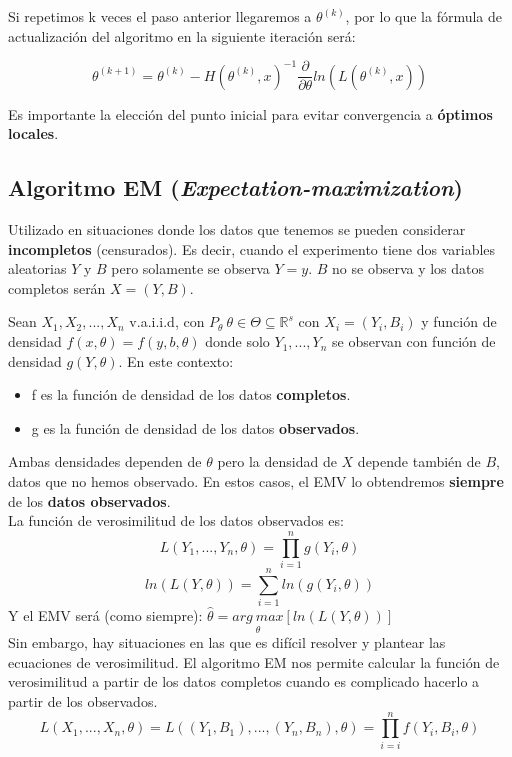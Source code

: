 Si repetimos k veces el paso anterior llegaremos a $\theta^{(k)}$, por lo que la fórmula de actualización del algoritmo en la siguiente iteración será:

$$\theta^{(k+1)}=\theta^{(k)}-H(\theta^{(k)},x)^{-1}\frac{\partial}{\partial\theta}ln(L(\theta^{(k)},x))$$

Es importante la elección del punto inicial para evitar convergencia a \textbf{óptimos locales}.

\newpage
\subsection{Algoritmo EM (\textit{Expectation-maximization})}

Utilizado en situaciones donde los datos que tenemos se pueden considerar \textbf{incompletos} (censurados). 
Es decir, cuando el experimento tiene dos variables aleatorias $Y$ y $B$ pero solamente se observa $Y=y$. $B$ no se observa y los datos completos serán $X=(Y,B)$. 

Sean $X_1, X_2,...,X_n$ v.a.i.i.d, con $P_\theta\ \theta\in\Theta\subseteq \mathbb{R}^s$ con $X_i=(Y_i,B_i)$ y función de densidad $f(x,\theta)=f(y,b,\theta)$ donde solo $Y_1,...,Y_n$ se observan con función de densidad $g(Y,\theta)$.
En este contexto:
\begin{itemize}
    \item f es la función de densidad de los datos \textbf{completos}.
    \item g es la función de densidad de los datos \textbf{observados}.
\end{itemize}
Ambas densidades dependen de $\theta$ pero la densidad de $X$ depende también de $B$, datos que no hemos observado. En estos casos, el EMV lo obtendremos \textbf{siempre} de los \textbf{datos observados}.
\\

La función de verosimilitud de los datos observados es:
$$L(Y_1,...,Y_n,\theta)= \prod_{i=1}^{n}g(Y_i,\theta)$$ $$ln(L(Y,\theta))=\sum_{i=1}^{n}ln(g(Y_i,\theta))$$ Y el EMV será (como siempre): $\hat\theta=\underset{\theta}{arg\ max}[ln(L(Y,\theta))]$
\\

Sin embargo, hay situaciones en las que es difícil resolver y plantear las ecuaciones de verosimilitud. El algoritmo EM nos permite calcular la función de verosimilitud a partir de los datos completos cuando es complicado hacerlo a partir de los observados.
$$L(X_1,...,X_n,\theta)=L((Y_1,B_1),...,(Y_n,B_n),\theta)=\prod_{i=i}^{n}f(Y_i,B_i,\theta)$$

